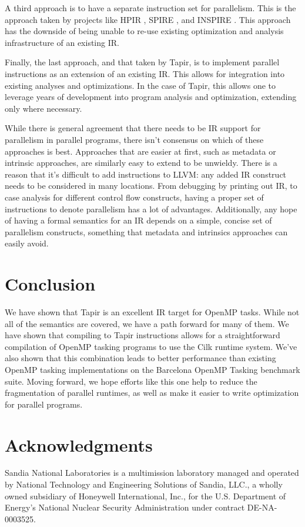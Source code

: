 \documentclass[sigconf]{acmart}
\begin{document}
A third approach is to have a separate instruction set for parallelism. This is
the approach taken by projects like HPIR \cite{}, SPIRE \cite{}, and INSPIRE
\cite{}. This approach has the downside of being unable to re-use existing
optimization and analysis infrastructure of an existing IR. 

Finally, the last approach, and that taken by Tapir, is to implement parallel 
instructions as an extension of an existing IR. This allows for integration
into existing analyses and optimizations. In the case of Tapir, this allows one
to leverage years of development into program analysis and optimization,
extending only where necessary. 

While there is general agreement that there needs to be IR support for
parallelism in parallel programs, there isn't consensus on which of these
approaches is best. Approaches that are easier at first, such as metadata
or intrinsic approaches, are similarly easy to extend to be unwieldy. There is
a reason that it's difficult to add instructions to LLVM: any added IR
construct needs to be considered in many locations. From debugging by printing
out IR, to case analysis for different control flow constructs, having 
a proper set of instructions to denote parallelism has a lot of advantages. 
Additionally, any hope of having a formal semantics for an IR depends on a 
simple, concise set of parallelism constructs, something that metadata and
intrinsics approaches can easily avoid. 

\section{Conclusion} \label{Sec:Conclusion}
We have shown that Tapir is an excellent IR target for OpenMP tasks. While not
all of the semantics are covered, we have a path forward for many of them. We have
shown that compiling to Tapir instructions allows for a straightforward compilation of 
OpenMP tasking programs to use the Cilk runtime system. We've also shown that this
combination leads to better performance than existing OpenMP tasking implementations
on the Barcelona OpenMP Tasking benchmark suite. Moving forward, we hope efforts like
this one help to reduce the fragmentation of parallel runtimes, as well as make
it easier to write optimization for parallel programs. 

\section*{Acknowledgments}
Sandia National Laboratories is a multimission laboratory managed and operated 
by National Technology and Engineering Solutions of Sandia, LLC., a wholly 
owned subsidiary of Honeywell International, Inc., for the U.S. Department of 
Energy’s National Nuclear Security Administration under contract DE-NA-0003525.
\end{document}
